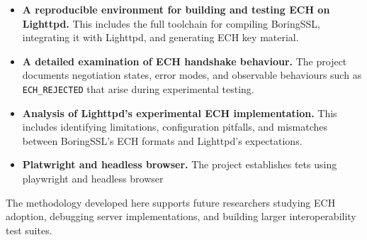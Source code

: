 \begin{itemize}
    \item \textbf{A reproducible environment for building and testing ECH on Lighttpd.}  
    This includes the full toolchain for compiling BoringSSL, integrating it with Lighttpd, and generating ECH key material.

    \item \textbf{A detailed examination of ECH handshake behaviour.}  
    The project documents negotiation states, error modes, and observable behaviours such as \texttt{ECH\_REJECTED} that arise during experimental testing.

    \item \textbf{Analysis of Lighttpd's experimental ECH implementation.}  
    This includes identifying limitations, configuration pitfalls, and mismatches between BoringSSL's ECH formats and Lighttpd's expectations.

    \item \textbf{Platwright and headless browser.}  
    The project establishes tets using playwright and headless browser

\end{itemize}

The methodology developed here supports future researchers studying ECH adoption, debugging server implementations, and building larger interoperability test suites.




